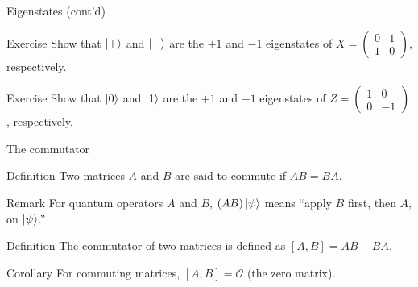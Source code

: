 \documentclass{beamer}
\renewcommand{\O}{\mathcal O}
\begin{document}
\begin{frame}{Eigenstates (cont'd)}

\begin{block}{Exercise}
Show that $\ket+$ and $\ket-$ are the $+1$ and $-1$ eigenstates of $X = \begin{pmatrix} 0 & 1 \\ 1 & 0 \end{pmatrix}$, respectively.
\end{block}

\begin{block}{Exercise}
Show that $\ket0$ and $\ket 1$ are the $+1$ and $-1$ eigenstates of $Z = \begin{pmatrix}
    1 & 0 \\ 0 & -1
\end{pmatrix}$, respectively.
\end{block}

\end{frame}

\begin{frame}{The commutator}

\begin{block}{Definition}
    Two matrices $A$ and $B$ are said to commute if $AB=BA$.
\end{block}

\begin{block}{Remark}
For quantum operators $A$ and $B$, $(AB)\ket\psi$ means ``apply $B$ first, then $A$, on $\ket\psi$.''
\end{block}

\begin{block}{Definition}
    The commutator of two matrices is defined as $[A,B]= AB-BA$.
\end{block}

\begin{block}{Corollary}
    For commuting matrices, $[A,B]=\O$ (the zero matrix).
\end{block}

\end{frame}
\end{document}
